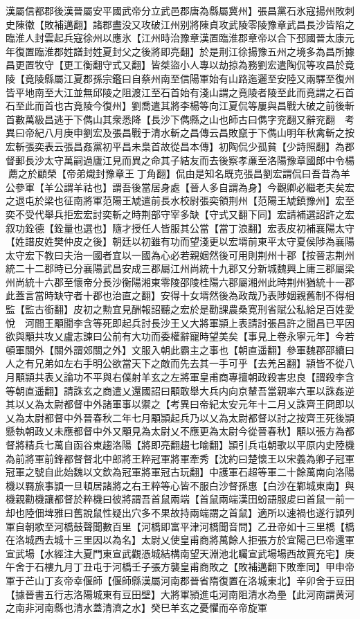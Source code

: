 漢屬信都郡後漢晉屬安平國武帝分立武邑郡唐為縣屬冀州】張昌黨石氷寇揚州敗刺史陳徽【敗補邁翻】諸郡盡没又攻破江州别將陳貞攻武陵零陵豫章武昌長沙皆陷之臨淮人封雲起兵寇徐州以應氷【江州時治豫章漢置臨淮郡章帝以合下邳國晉太康元年復置臨淮郡姓譜封姓夏封父之後將即亮翻】於是荆江徐揚豫五州之境多為昌所據昌更置牧守【更工衡翻守式又翻】皆桀盜小人專以劫掠為務劉宏遣陶侃等攻昌於竟陵【竟陵縣屬江夏郡孫宗鑑曰自蔡州南至信陽軍始有山路迤邐至安陸又兩驛至復州皆平地南至大江並無邱陵之阻渡江至石首始有淺山謂之竟陵者陵至此而竟謂之石首石至此而首也古竟陵今復州】劉喬遣其將李楊等向江夏侃等屢與昌戰大破之前後斬首數萬級昌逃于下儁山其衆悉降【長沙下儁縣之山也師古曰儁字兖翻又辭兖翻　考異曰帝紀八月庚申劉宏及張昌戰于清水斬之昌傳云昌敗竄于下儁山明年秋禽斬之按宏斬張奕表云張昌姦黨初平昌未梟首故從昌本傳】初陶侃少孤貧【少詩照翻】為郡督郵長沙太守萬嗣過廬江見而異之命其子結友而去後察孝亷至洛陽豫章國郎中令楊薦之於顧榮【帝弟熾封豫章王丁角翻】侃由是知名既克張昌劉宏謂侃曰吾昔為羊公參軍【羊公謂羊祜也】謂吾後當居身處【晉人多自謂為身】今觀卿必繼老夫矣宏之退屯於梁也征南將軍范陽王虓遣前長水校尉張奕領荆州【范陽王虓鎮豫州】宏至奕不受代舉兵拒宏宏討奕斬之時荆部守宰多缺【守式又翻下同】宏請補選詔許之宏叙功銓德【銓量也選也】隨才授任人皆服其公當【當丁浪翻】宏表皮初補襄陽太守【姓譜皮姓樊仲皮之後】朝廷以初雖有功而望淺更以宏壻前東平太守夏侯陟為襄陽太守宏下教曰夫治一國者宜以一國為心必若親姻然後可用則荆州十郡【按晉志荆州統二十二郡時已分襄陽武昌安成三郡屬江州尚統十九郡又分新城魏興上庸三郡屬梁州尚統十六郡至懷帝分長沙衡陽湘東零陵邵陵桂陽六郡屬湘州此時荆州猶統十一郡此蓋言當時缺守者十郡也治直之翻】安得十女壻然後為政哉乃表陟姻親舊制不得相監【監古銜翻】皮初之勲宜見酬報詔聽之宏於是勸課農桑寛刑省賦公私給足百姓愛悅　河間王顒聞李含等死即起兵討長沙王乂大將軍頴上表請討張昌許之聞昌已平因欲與顒共攻乂盧志諫曰公前有大功而委權辭寵時望美矣【事見上卷永寧元年】今若頓軍關外【關外謂郊關之外】文服入朝此霸主之事也【朝直遥翻】參軍魏郡邵續曰人之有兄弟如左右手明公欲當天下之敵而先去其一手可乎【去羌呂翻】頴皆不從八月顒頴共表乂論功不平與右僕射羊玄之左將軍皇甫商專擅朝政殺害忠良【謂殺李含等朝直遥翻】請誅玄之商遣乂還國詔曰顒敢舉大兵内向京輦吾當親率六軍以誅姦逆其以乂為太尉都督中外諸軍事以禦之【考異曰帝紀太安元年十二月乂誅齊王冏即以乂為太尉都督中外晉春秋二年七月顒頴起兵乃以乂為太尉都督以討之按齊王死後頴懸執朝政乂未應都督中外又顒見為太尉乂不應更為太尉今從晉春秋】顒以張方為都督將精兵七萬自函谷東趨洛陽【將即亮翻趨七喻翻】頴引兵屯朝歌以平原内史陸機為前將軍前鋒都督督北中郎將王粹冠軍將軍牽秀【沈約曰楚懷王以宋義為卿子冠軍冠軍之號自此始魏以文欽為冠軍將軍冠古玩翻】中護軍石超等軍二十餘萬南向洛陽機以羇旅事頴一旦頓居諸將之右王粹等心皆不服白沙督孫惠【白沙在鄴城東南】與機親勸機讓都督於粹機曰彼將謂吾首鼠兩端【首鼠兩端漢田蚡語服䖍曰首鼠一前一却也陸佃埤雅曰舊說鼠性疑出穴多不果故持兩端謂之首鼠】適所以速禍也遂行頴列軍自朝歌至河橋鼓聲聞數百里【河橋即富平津河橋聞音問】乙丑帝如十三里橋【橋在洛城西去城十三里因以為名】太尉乂使皇甫商將萬餘人拒張方於宜陽己巳帝還軍宣武場【水經注大夏門東宣武觀憑城結構南望天淵池北矚宣武場場西故賈充宅】庚午舍于石樓九月丁丑屯于河橋壬子張方襲皇甫商敗之【敗補邁翻下敗牽同】甲申帝軍于芒山丁亥帝幸偃師【偃師縣漢屬河南郡晉省隋復置在洛城東北】辛卯舍于豆田【據晉書五行志洛陽城東有豆田壁】大將軍頴進屯河南阻清水為壘【此河南謂黄河之南非河南縣也清水蓋清濟之水】癸巳羊玄之憂懼而卒帝旋軍